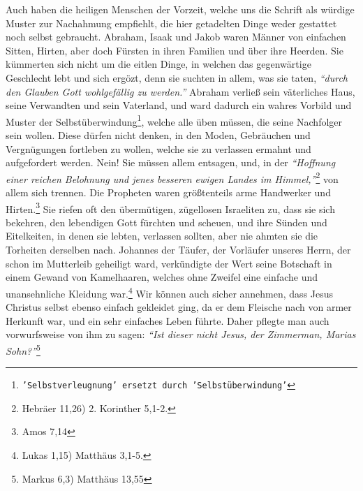 Auch haben die heiligen Menschen der Vorzeit, welche uns die
Schrift als würdige
Muster zur Nachahmung empfiehlt, die hier getadelten Dinge weder gestattet noch
selbst gebraucht. Abraham, Isaak
und
Jakob waren Männer von einfachen Sitten,
Hirten, aber doch Fürsten in ihren Familien und über ihre Heerden. Sie
kümmerten sich nicht um die eitlen Dinge, in welchen das gegenwärtige
Geschlecht lebt und sich ergözt, denn sie suchten in allem, was sie taten,
\textit{"`durch den Glauben Gott wohlgefällig zu werden."'} Abraham verließ sein
väterliches Haus, seine Verwandten und sein Vaterland, und ward dadurch ein
wahres Vorbild und Muster der
Selbstüberwindung\footnote{\texttt{'Selbstverleugnung'
ersetzt durch 'Selbstüberwindung'}}, welche alle üben müssen, die
seine Nachfolger sein wollen. Diese dürfen nicht denken, in den Moden,
Gebräuchen und Vergnügungen fortleben zu wollen, welche sie zu verlassen
ermahnt und aufgefordert werden. Nein! Sie müssen allem
entsagen, und, in der
\textit{"`Hoffnung einer reichen Belohnung und jenes besseren ewigen Landes im
Himmel,"'}\footnote{Hebräer 11,26) 2. Korinther
5,1-2.}
von allem sich trennen. Die
Propheten waren größtenteils arme Handwerker und
Hirten.\footnote{Amos 7,14}
Sie riefen oft den übermütigen, zügellosen
Israeliten zu, dass sie
sich bekehren,
den lebendigen Gott fürchten und scheuen, und ihre
Sünden und Eitelkeiten, in
denen sie lebten, verlassen sollten, aber nie ahmten sie die Torheiten
derselben nach. Johannes der Täufer, der
Vorläufer unseres
Herrn, der schon im
Mutterleib geheiligt ward, verkündigte der Wert seine Botschaft
in einem
Gewand von Kamelhaaren, welches ohne Zweifel eine einfache und unansehnliche
Kleidung war.\footnote{Lukas 1,15) Matthäus
3,1-5.}
Wir können auch sicher annehmen,
dass Jesus Christus selbst ebenso einfach gekleidet ging, da er dem Fleische
nach von armer Herkunft war, und ein sehr einfaches
Leben
führte. Daher pflegte
man auch vorwurfsweise von ihm zu sagen:
\textit{"`Ist dieser nicht Jesus, der
Zimmerman, Marias Sohn?"'}\footnote{Markus 6,3) Matthäus 13,55}
